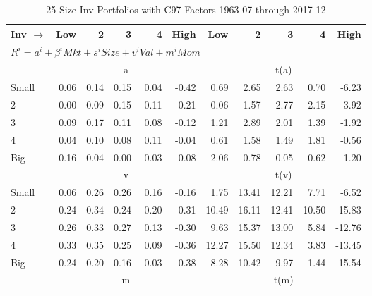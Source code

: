 
\begin{table}[!ht]
\footnotesize
\centering
\caption{25-Size-Inv Portfolios with C97 Factors 1963-07 through 2017-12}
\begin{tabular}{lrrrrrrrrrr}
  \toprule
    Inv $\rightarrow$ & Low & 2 & 3 & 4 & High & Low & 2 & 3 & 4 & High \\ 
  \midrule
  \multicolumn{11}{l}{$R^i=a^i+\beta^iMkt+s^iSize+v^iVal+m^iMom$} \\

  
    
      & \multicolumn{5}{c}{a} & \multicolumn{5}{c}{t(a)}
    
    \\
      \cmidrule(r){2-6} \cmidrule(r){7-11}

    Small   & 0.06  & 0.14  & 0.15  & 0.04  & -0.42  & 0.69  & 2.65  & 2.63  & 0.70  & -6.23  \\
         2  & 0.00  & 0.09  & 0.15  & 0.11  & -0.21  & 0.06  & 1.57  & 2.77  & 2.15  & -3.92  \\
         3  & 0.09  & 0.17  & 0.11  & 0.08  & -0.12  & 1.21  & 2.89  & 2.01  & 1.39  & -1.92  \\
         4  & 0.04  & 0.10  & 0.08  & 0.11  & -0.04  & 0.61  & 1.58  & 1.49  & 1.81  & -0.56  \\
    Big     & 0.16  & 0.04  & 0.00  & 0.03  & 0.08  & 2.06  & 0.78  & 0.05  & 0.62  & 1.20  \\

  
    
      & \multicolumn{5}{c}{v} & \multicolumn{5}{c}{t(v)}
    
    \\
      \cmidrule(r){2-6} \cmidrule(r){7-11}

    Small   & 0.06  & 0.26  & 0.26  & 0.16  & -0.16  & 1.75  & 13.41  & 12.21  & 7.71  & -6.52  \\
         2  & 0.24  & 0.34  & 0.24  & 0.20  & -0.31  & 10.49  & 16.11  & 12.41  & 10.50  & -15.83  \\
         3  & 0.26  & 0.33  & 0.27  & 0.13  & -0.30  & 9.63  & 15.37  & 13.00  & 5.84  & -12.76  \\
         4  & 0.33  & 0.35  & 0.25  & 0.09  & -0.36  & 12.27  & 15.50  & 12.34  & 3.83  & -13.45  \\
    Big     & 0.24  & 0.20  & 0.16  & -0.03  & -0.38  & 8.28  & 10.42  & 9.97  & -1.44  & -15.54  \\

  
    
      & \multicolumn{5}{c}{m} & \multicolumn{5}{c}{t(m)}
    

\end{tabular}
\end{table}
